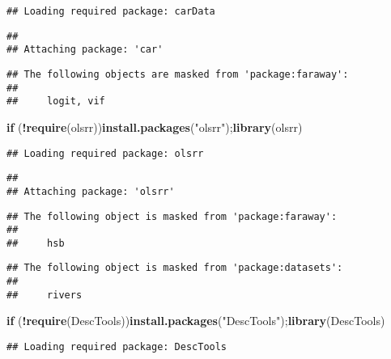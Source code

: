 \documentclass[
]{article}
\newenvironment{Shaded}{\begin{snugshade}}{\end{snugshade}}
\newcommand{\ControlFlowTok}[1]{\textcolor[rgb]{0.13,0.29,0.53}{\textbf{#1}}}
\newcommand{\FunctionTok}[1]{\textcolor[rgb]{0.13,0.29,0.53}{\textbf{#1}}}
\newcommand{\NormalTok}[1]{#1}
\newcommand{\SpecialCharTok}[1]{\textcolor[rgb]{0.81,0.36,0.00}{\textbf{#1}}}
\newcommand{\StringTok}[1]{\textcolor[rgb]{0.31,0.60,0.02}{#1}}
\begin{document}
\begin{verbatim}
## Loading required package: carData
\end{verbatim}

\begin{verbatim}
## 
## Attaching package: 'car'
\end{verbatim}

\begin{verbatim}
## The following objects are masked from 'package:faraway':
## 
##     logit, vif
\end{verbatim}

\begin{Shaded}
\begin{Highlighting}[]
\ControlFlowTok{if}\NormalTok{ (}\SpecialCharTok{!}\FunctionTok{require}\NormalTok{(}\StringTok{\textquotesingle{}olsrr\textquotesingle{}}\NormalTok{))}\FunctionTok{install.packages}\NormalTok{(}\StringTok{"olsrr"}\NormalTok{);}\FunctionTok{library}\NormalTok{(olsrr)}
\end{Highlighting}
\end{Shaded}

\begin{verbatim}
## Loading required package: olsrr
\end{verbatim}

\begin{verbatim}
## 
## Attaching package: 'olsrr'
\end{verbatim}

\begin{verbatim}
## The following object is masked from 'package:faraway':
## 
##     hsb
\end{verbatim}

\begin{verbatim}
## The following object is masked from 'package:datasets':
## 
##     rivers
\end{verbatim}

\begin{Shaded}
\begin{Highlighting}[]
\ControlFlowTok{if}\NormalTok{ (}\SpecialCharTok{!}\FunctionTok{require}\NormalTok{(}\StringTok{\textquotesingle{}DescTools\textquotesingle{}}\NormalTok{))}\FunctionTok{install.packages}\NormalTok{(}\StringTok{"DescTools"}\NormalTok{);}\FunctionTok{library}\NormalTok{(DescTools)}
\end{Highlighting}
\end{Shaded}

\begin{verbatim}
## Loading required package: DescTools
\end{verbatim}
\end{document}
